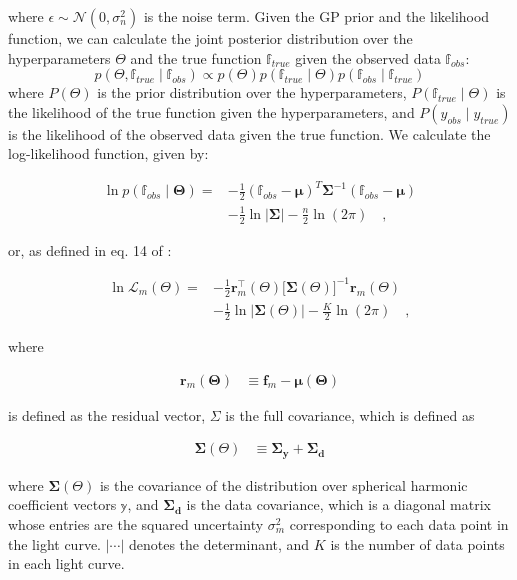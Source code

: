 \documentclass[twocolumn]{aastex631}
\begin{document}
where $\epsilon \sim \mathcal{N}(0, \sigma_n^2)$ is the noise term. Given the GP prior and the likelihood function, we can 
calculate the joint posterior distribution over the hyperparameters $\Theta$ and the true function $\mathbb{f}_{true}$ given the observed data $\mathbb{f}_{obs}$:
%
\begin{equation}
    p(\Theta, \mathbb{f}_{true} \mid \mathbb{f}_{obs}) \propto p(\Theta) p(\mathbb{f}_{true} \mid \Theta) p(\mathbb{f}_{obs} \mid \mathbb{f}_{true})
\end{equation}
%
where $P(\Theta)$ is the prior distribution over the hyperparameters, $P(\mathbb{f}_{true} \mid \Theta)$ is the likelihood of the true function given the hyperparameters, and $P(y_{obs} \mid y_{true})$ is the likelihood of the observed data given the true function.
We calculate the log-likelihood function, given by:
%
\begin{linenomath}\begin{align}
    \label{eq:log-likeSabina}
    \ln p(\mathbb{f}_{obs} \mid \pmb{\Theta}) 
    =
    & -\frac{1}{2} (\mathbb{f}_{obs} - \pmb{\mu})^T \pmb{\Sigma}^{-1} (\mathbb{f}_{obs} - \pmb{\mu}) 
    \nonumber       \\[0.75em]
    & -
    \frac{1}{2} \ln |\pmb{\Sigma}| - \frac{n}{2} \ln (2\pi)
    \quad,
\end{align}\end{linenomath}
%
or, as defined in eq. 14 of \citep{Luger2021}:
%
\begin{linenomath}\begin{align}
    \label{eq:log-likeRodrigo}
    \ln \mathcal{L}_m\left(\Theta\right)
    =
     & -\frac{1}{2}
    \mathbf{r}_m^\top\left(\Theta\right)
    \big[
        \pmb{\Sigma}\left(\Theta\right)
        \big]^{-1}
    \mathbf{r}_m\left(\Theta\right)
    \nonumber       \\[0.75em]
     & -
    \frac{1}{2}
    \ln \Big|
    \pmb{\Sigma}\left(\Theta\right)
    \Big|
    -
    \frac{K}{2}
    \ln \left( 2 \pi \right)
    \quad,
\end{align}\end{linenomath}
%
where
%
\begin{linenomath}\begin{align}
        \mathbf{r}_m\left(\pmb{\Theta}\right)
         & \equiv
        \mathbf{f}_m - \pmb{\mu}\left(\pmb{\Theta}\right)
    \end{align}\end{linenomath}
%
is defined as the residual vector,
%
$\Sigma$ is the full covariance, which is defined as 
%
\begin{linenomath}\begin{align}
    \pmb{\Sigma}\left(\Theta\right)
     & \equiv
    \pmb{\Sigma_y} + \pmb{\Sigma_d}
\end{align}\end{linenomath}
%
where $\pmb{\Sigma}(\Theta)$ is the covariance of the distribution over spherical harmonic coefficient
vectors $\mathbb{y}$, and $\pmb{\Sigma_d}$ is the data covariance, which is a diagonal
matrix whose entries are the squared uncertainty $\sigma_m^2$ corresponding to each data point in the light curve.
$| \cdots |$ denotes the determinant, and $K$ is the number of data points in
each light curve.%
\end{document}
